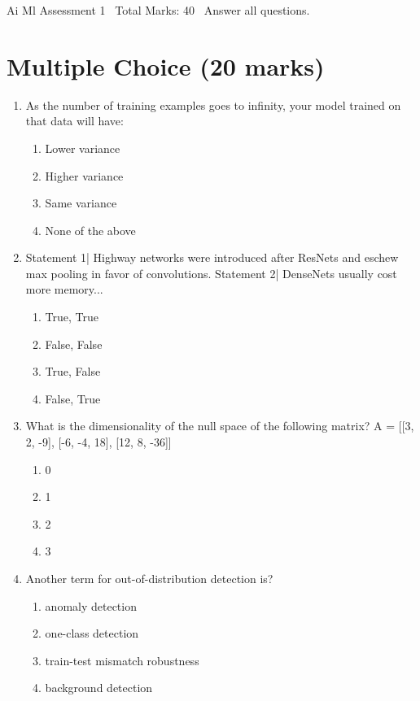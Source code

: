 \documentclass[12pt]{article}
\begin{document}
\begin{center}
Ai Ml Assessment 1 \
Total Marks: 40 \
Answer all questions.
\end{center}

\section*{Multiple Choice (20 marks)}
\begin{enumerate}[label=\arabic*.]
\item As the number of training examples goes to infinity, your model trained on that data will have:
\begin{enumerate}[label=(\alph*)]
    \item Lower variance
    \item Higher variance
    \item Same variance
    \item None of the above
\end{enumerate}
\item Statement 1| Highway networks were introduced after ResNets and eschew max pooling in favor of convolutions. Statement 2| DenseNets usually cost more memory...
\begin{enumerate}[label=(\alph*)]
    \item True, True
    \item False, False
    \item True, False
    \item False, True
\end{enumerate}
\item What is the dimensionality of the null space of the following matrix? A = [[3, 2, -9], [-6, -4, 18], [12, 8, -36]]
\begin{enumerate}[label=(\alph*)]
    \item 0
    \item 1
    \item 2
    \item 3
\end{enumerate}
\item Another term for out-of-distribution detection is?
\begin{enumerate}[label=(\alph*)]
    \item anomaly detection
    \item one-class detection
    \item train-test mismatch robustness
    \item background detection
\end{enumerate}

\end{enumerate}
\end{document}

